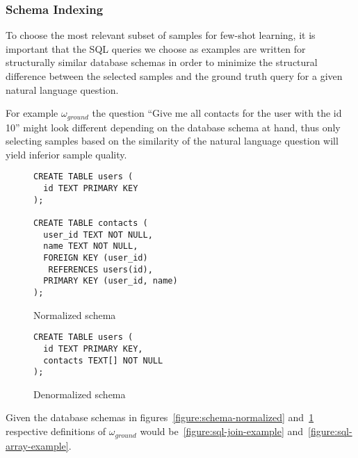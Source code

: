\subsubsection{Schema Indexing}

To choose the most relevant subset of samples for few-shot learning,
it is important that the SQL queries we choose as examples are written for
structurally similar database schemas in order to minimize the structural
difference between the selected samples and the ground truth query for a given
natural language question.

For example $\omega_{ground}$ the question ``Give me all contacts for the user with the id 10''
might look different depending on the database schema at hand, thus only selecting
samples based on the similarity of the natural language question will yield inferior
sample quality.

\begin{figure}[ht]
  \vspace{1em}
  \hfill
  \begin{minipage}[b]{0.45\linewidth}
    \begin{verbatim}
CREATE TABLE users (
  id TEXT PRIMARY KEY
);

CREATE TABLE contacts (
  user_id TEXT NOT NULL,
  name TEXT NOT NULL,
  FOREIGN KEY (user_id) 
   REFERENCES users(id),
  PRIMARY KEY (user_id, name)
);
    \end{verbatim}
    \caption{Normalized schema}
    \label{figure:schema-normalized}
  \end{minipage}
  \hfill
  \begin{minipage}[b]{0.35\linewidth}
    \begin{verbatim}
CREATE TABLE users (
  id TEXT PRIMARY KEY,
  contacts TEXT[] NOT NULL
);
    \end{verbatim}
    \vspace{3.75em}
    \caption{Denormalized schema}
    \label{figure:schema-denormalized}
  \end{minipage}
  \hfill
  \vspace{1em}
\end{figure}

Given the database schemas in figures~\ref{figure:schema-normalized} and~\ref{figure:schema-denormalized}
respective definitions of $\omega_{ground}$ would be~\ref{figure:sql-join-example}
and~\ref{figure:sql-array-example}.

